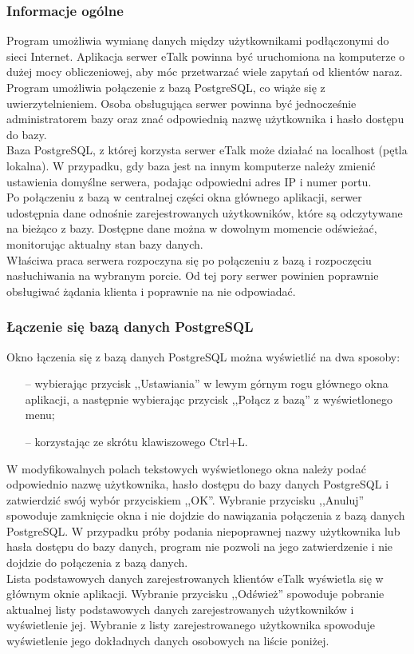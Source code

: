 \documentclass[a4paper,12pt]{article}
\begin{document}
\subsubsection[Informacje ogólne]{Informacje ogólne}
Program umożliwia wymianę danych między użytkownikami podłączonymi do sieci Internet.
Aplikacja serwer eTalk powinna być uruchomiona na komputerze o dużej mocy obliczeniowej, aby móc przetwarzać wiele zapytań od klientów naraz.\\
Program umożliwia połączenie z bazą PostgreSQL, co wiąże się z uwierzytelnieniem. Osoba obsługująca serwer powinna być jednocześnie administratorem bazy oraz znać odpowiednią nazwę użytkownika i hasło dostępu do bazy.\\
Baza PostgreSQL, z której korzysta serwer eTalk może działać na localhost (pętla lokalna). W przypadku, gdy baza jest na innym komputerze należy zmienić ustawienia domyślne serwera, podając odpowiedni adres IP i numer portu.\\
Po połączeniu z bazą w centralnej części okna głównego aplikacji, serwer udostępnia dane odnośnie zarejestrowanych użytkowników, które są odczytywane na bieżąco z bazy. Dostępne dane można w dowolnym momencie odświeżać, monitorując aktualny stan bazy danych.\\
Właściwa praca serwera rozpoczyna się po połączeniu z bazą i rozpoczęciu nasłuchiwania na wybranym porcie.
Od tej pory serwer powinien poprawnie obsługiwać żądania klienta i poprawnie na nie odpowiadać.

\subsubsection[Łączenie się bazą danych PostgreSQL]{Łączenie się bazą danych PostgreSQL}
Okno łączenia się z bazą danych PostgreSQL można wyświetlić na dwa sposoby:
\begin{itemize}
\item[--] wybierając przycisk ,,Ustawiania'' w lewym górnym rogu głównego okna aplikacji,
a następnie wybierając przycisk ,,Połącz z bazą'' z wyświetlonego menu;
\item[--] korzystając ze skrótu klawiszowego Ctrl+L.
\end{itemize}
W modyfikowalnych polach tekstowych wyświetlonego okna należy podać odpowiednio nazwę użytkownika, hasło dostępu do bazy danych PostgreSQL i zatwierdzić swój wybór przyciskiem ,,OK''.
Wybranie przycisku ,,Anuluj'' spowoduje zamknięcie okna i nie dojdzie do nawiązania
połączenia z bazą danych PostgreSQL.
W przypadku próby podania niepoprawnej nazwy użytkownika lub hasła dostępu do bazy danych, program nie pozwoli na jego
zatwierdzenie i nie dojdzie do połączenia z bazą danych.\\
Lista podstawowych danych zarejestrowanych klientów eTalk wyświetla się w głównym oknie aplikacji.
Wybranie przycisku ,,Odśwież'' spowoduje pobranie aktualnej listy podstawowych danych zarejestrowanych użytkowników i wyświetlenie jej.
Wybranie z listy zarejestrowanego użytkownika spowoduje wyświetlenie jego dokładnych danych osobowych na liście poniżej.
\end{document}
